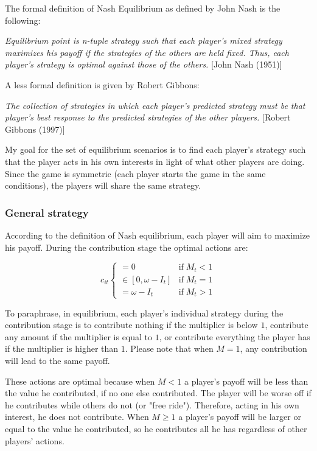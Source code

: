 		The formal definition of Nash Equilibrium as defined by John Nash is the following:
		
		\begin{displayquote}
			\textit{
				Equilibrium point is n-tuple strategy such that each player's mixed strategy maximizes his payoff if the strategies of the others are held fixed. Thus, each player's strategy is optimal against those of the others.
			}
			[John Nash (1951)]
		\end{displayquote}
		
		A less formal definition is given by Robert Gibbons:

		\begin{displayquote}
			\textit{
				The collection of strategies in which each player's predicted strategy must be that player's best response to the predicted strategies of the other players.
			}
			[Robert Gibbons (1997)]
		\end{displayquote}

		My goal for the set of equilibrium scenarios is to find each player's strategy such that the player acts in his own interests in light of what other players are doing. Since the game is symmetric (each player starts the game in the same conditions), the players will share the same strategy.

		\subsubsection{General strategy}

			According to the definition of Nash equilibrium, each player will aim to maximize his payoff. During the contribution stage the optimal actions are:

			\[
				c_{it}  
					\begin{cases}
						= 0 					& \text{if} \; M_t < 1 \\
						\in [0, \omega - I_t]	& \text{if} \; M_t = 1 \\
						= \omega - I_t			& \text{if} \; M_t > 1
					\end{cases}
			\]

			To paraphrase, in equilibrium, each player's individual strategy during the contribution stage is to contribute nothing if the multiplier is below $1$, contribute any amount if the multiplier is equal to $1$, or contribute everything the player has if the multiplier is higher than $1$. Please note that when $M = 1$, any contribution will lead to the same payoff.

			These actions are optimal because when $M< 1$ a player's payoff will be less than the value he contributed, if no one else contributed. The player will be worse off if he contributes while others do not (or "free ride"). Therefore, acting in his own interest, he does not contribute. When $M \ge 1$ a player's payoff will be larger or equal to the value he contributed, so he contributes all he has regardless of other players' actions.

